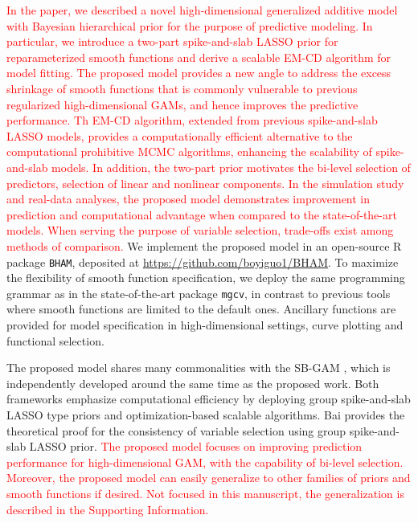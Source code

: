 \documentclass[AMA,STIX1COL,]{WileyNJD-v2}
\begin{document}
\textcolor{red}{In the paper, we described a novel high-dimensional generalized additive model with Bayesian hierarchical prior for the purpose of predictive modeling. In particular, we introduce a two-part spike-and-slab LASSO prior for reparameterized smooth functions and derive a scalable EM-CD algorithm for model fitting. The proposed model provides a new angle to address the excess shrinkage of smooth functions that is commonly vulnerable to previous regularized high-dimensional GAMs, and hence improves the predictive performance. Th EM-CD algorithm, extended from previous spike-and-slab LASSO models, provides a computationally efficient alternative to the computational prohibitive MCMC algorithms, enhancing the scalability of spike-and-slab models. In addition, the two-part prior motivates the bi-level selection of predictors, selection of linear and nonlinear components. In the simulation study and real-data analyses, the proposed model demonstrates improvement in prediction and computational advantage when compared to the state-of-the-art models. When serving the purpose of variable selection, trade-offs exist among methods of comparison.}
We implement the proposed model in an open-source R package
\texttt{BHAM}, deposited at \url{https://github.com/boyiguo1/BHAM}. To
maximize the flexibility of smooth function specification, we deploy the
same programming grammar as in the state-of-the-art package
\texttt{mgcv}, in contrast to previous tools where smooth functions are
limited to the default ones. Ancillary functions are provided for model
specification in high-dimensional settings, curve plotting and
functional selection.

The proposed model shares many commonalities with the SB-GAM
\citep{Bai2021}, which is independently developed around the same time
as the proposed work. Both frameworks emphasize computational efficiency
by deploying group spike-and-slab LASSO type priors and
optimization-based scalable algorithms. Bai provides the theoretical
proof for the consistency of variable selection using group
spike-and-slab LASSO prior.
\textcolor{red}{The proposed model focuses on improving prediction performance for high-dimensional GAM, with the capability of bi-level selection. Moreover, the proposed model can easily generalize to other families of priors and smooth functions if desired. Not focused in this manuscript, the generalization is described in the Supporting Information.}
\end{document}
